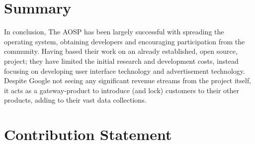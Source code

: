 \documentclass[conference]{IEEEtran}
\begin{document}
\section{Summary}
\label{summary}

In conclusion, The AOSP has been largely successful with spreading the operating system, obtaining developers and encouraging participation from the community. Having based their work on an already established, open source, project; they have limited the initial research and development costs, instead focusing on developing user interface technology and advertisement technology. Despite Google not seeing any significant revenue streams from the project itself, it acts as a gateway-product to introduce (and lock) customers to their other products, adding to their vast data collections.


\section{Contribution Statement}
\label{contribution}
\end{document}
